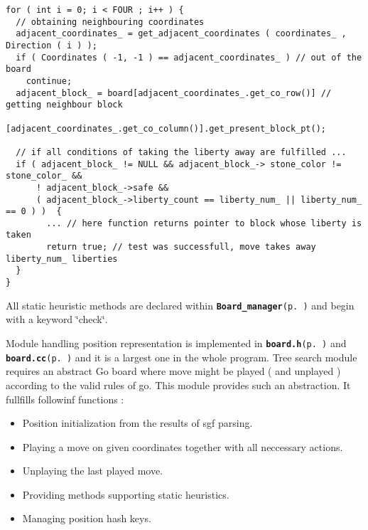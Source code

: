 \footnotesize\begin{verbatim}for ( int i = 0; i < FOUR ; i++ ) {
  // obtaining neighbouring coordinates 
  adjacent_coordinates_ = get_adjacent_coordinates ( coordinates_ , Direction ( i ) ); 
  if ( Coordinates ( -1, -1 ) == adjacent_coordinates_ ) // out of the board
    continue;
  adjacent_block_ = board[adjacent_coordinates_.get_co_row()] // getting neighbour block
                         [adjacent_coordinates_.get_co_column()].get_present_block_pt();

  // if all conditions of taking the liberty away are fulfilled ...
  if ( adjacent_block_ != NULL && adjacent_block_-> stone_color != stone_color_ && 
      ! adjacent_block_->safe &&    
      ( adjacent_block_->liberty_count == liberty_num_ || liberty_num_ == 0 ) )  { 
        ... // here function returns pointer to block whose liberty is taken 
        return true; // test was successfull, move takes away liberty_num_ liberties
  }
}
\end{verbatim}
\normalsize


All static heuristic methods are declared within {\tt {\bf Board\_\-manager}{\rm (p.\,\pageref{classBoard__manager})}} and begin with a keyword \char`\"{}check\char`\"{}.

Module handling position representation is implemented in {\tt {\bf board.h}{\rm (p.\,\pageref{board_8h})}} and {\tt {\bf board.cc}{\rm (p.\,\pageref{board_8cc})}} and it is a largest one in the whole program. Tree search module requires an abstract Go board where move might be played ( and unplayed ) according to the valid rules of go. This module provides such an abstraction. It fullfills followinf functions :\begin{itemize}
\item Position initialization from the results of sgf parsing.\item Playing a move on given coordinates together with all neccessary actions.\item Unplaying the last played move.\item Providing methods supporting static heuristics.\item Managing position hash keys.\end{itemize}


